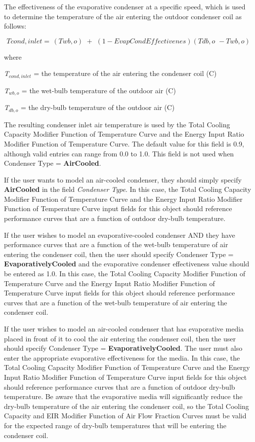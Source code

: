 The effectiveness of the evaporative condenser at a specific speed, which is used to determine the temperature of the air entering the outdoor condenser coil as follows:

\begin{equation}
Tcond,inlet = \,\left( {Twb,o} \right)\,\, + \,\,\left( {1 - EvapCondEffectivenes} \right)\left( {Tdb,o\,\, - Twb,o} \right)
\end{equation}

where

\emph{T\(_{cond,inlet}\)} = the temperature of the air entering the condenser coil (C)

\emph{T\(_{wb,o}\)} = the wet-bulb temperature of the outdoor air (C)

\emph{T\(_{db,o}\)} = the dry-bulb temperature of the outdoor air (C)

The resulting condenser inlet air temperature is used by the Total Cooling Capacity Modifier Function of Temperature Curve and the Energy Input Ratio Modifier Function of Temperature Curve. The default value for this field is 0.9, although valid entries can range from 0.0 to 1.0. This field is not used when Condenser Type = \textbf{AirCooled}.

If the user wants to model an air-cooled condenser, they should simply specify \textbf{AirCooled} in the field \textit{Condenser Type}. In this case, the Total Cooling Capacity Modifier Function of Temperature Curve and the Energy Input Ratio Modifier Function of Temperature Curve input fields for this object should reference performance curves that are a function of outdoor dry-bulb temperature.

If the user wishes to model an evaporative-cooled condenser AND they have performance curves that are a function of the wet-bulb temperature of air entering the condenser coil, then the user should specify Condenser Type = \textbf{EvaporativelyCooled} and the evaporative condenser effectiveness value should be entered as 1.0. In this case, the Total Cooling Capacity Modifier Function of Temperature Curve and the Energy Input Ratio Modifier Function of Temperature Curve input fields for this object should reference performance curves that are a function of the wet-bulb temperature of air entering the condenser coil.

If the user wishes to model an air-cooled condenser that has evaporative media placed in front of it to cool the air entering the condenser coil, then the user should specify Condenser Type = \textbf{EvaporativelyCooled}. The user must also enter the appropriate evaporative effectiveness for the media. In this case, the Total Cooling Capacity Modifier Function of Temperature Curve and the Energy Input Ratio Modifier Function of Temperature Curve input fields for this object should reference performance curves that are a function of outdoor dry-bulb temperature. Be aware that the evaporative media will significantly reduce the dry-bulb temperature of the air entering the condenser coil, so the Total Cooling Capacity and EIR Modifier Function of Air Flow Fraction Curves must be valid for the expected range of dry-bulb temperatures that will be entering the condenser coil.

